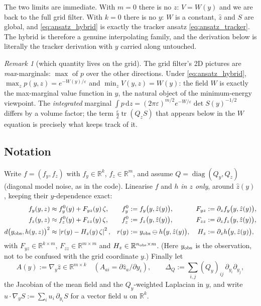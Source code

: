 \documentclass[11pt,a4paper]{article}
\newcommand{\R}{\mathbb{R}}
\newcommand{\dd}{\,\mathrm{d}}
\newcommand{\tr}{\operatorname{tr}}
\newcommand{\zh}{\hat{z}}
\newcommand{\eps}{\varepsilon}
\newcommand{\abs}[1]{\left\lvert #1 \right\rvert}
\newcommand{\gy}{\nabla_{\!y}}
\theoremstyle{plain}
\theoremstyle{definition}
\theoremstyle{remark}
\newtheorem{remark}{Remark}
\begin{document}
The two limits are immediate. With $m=0$ there is no $z$: $V=W(y)$ and we are back to the full grid filter. With $k=0$ there is no $y$: $W$ is a constant, $\zh$ and $S$ are global, and \eqref{eq:ansatz_hybrid} is exactly the tracker ansatz \eqref{eq:ansatz_tracker}. The hybrid is therefore a genuine interpolating family, and the derivation below is literally the tracker derivation with $y$ carried along untouched.

\begin{remark}[which quantity lives on the grid]
The grid filter's 2D pictures are \emph{max}-marginals: $\max$ of $p$ over the other directions. Under \eqref{eq:ansatz_hybrid}, $\max_z p(y,z) = e^{-W(y)/\eps}$ and $\min_z V(y,z)=W(y)$: the field $W$ is exactly the max-marginal value function in $y$, the natural object of the minimum-energy viewpoint. The \emph{integrated} marginal $\int p\dd z = (2\pi\eps)^{m/2} e^{-W/\eps}\det S(y)^{-1/2}$ differs by a volume factor; the term $\frac{\eps}{2}\tr(Q_zS)$ that appears below in the $W$ equation is precisely what keeps track of it.
\end{remark}

\subsection{Notation}

Write $f=(f_y,f_z)$ with $f_y\in\R^k$, $f_z\in\R^m$, and assume $Q=\operatorname{diag}(Q_y,Q_z)$ (diagonal model noise, as in the code). Linearise $f$ and $h$ \emph{in $z$ only}, around $\zh(y)$, keeping their $y$-dependence exact:
\begin{align*}
  f_y(y,z) &\approx f_y^0(y) + F_{yz}(y)\,\zeta, & f_y^0 &:= f_y\big(y,\zh(y)\big), & F_{yz} &:= \partial_z f_y\big(y,\zh(y)\big),\\
  f_z(y,z) &\approx f_z^0(y) + F_{zz}(y)\,\zeta, & f_z^0 &:= f_z\big(y,\zh(y)\big), & F_{zz} &:= \partial_z f_z\big(y,\zh(y)\big),\\
  d\big(y_{\rm obs},h(y,z)\big)^2 &\approx \abs{r(y) - H_z(y)\,\zeta}^2, & r(y) &:= y_{\rm obs}\ominus h\big(y,\zh(y)\big), & H_z &:= \partial_z h\big(y,\zh(y)\big),
\end{align*}
with $F_{yz}\in\R^{k\times m}$, $F_{zz}\in\R^{m\times m}$ and $H_z\in\R^{n_{\rm obs}\times m}$. (Here $y_{\rm obs}$ is the observation, not to be confused with the grid coordinate $y$.) Finally let
\[
  A(y) := \gy\zh \in\R^{m\times k}\quad (A_{ai}=\partial\zh_a/\partial y_i), \qquad
  \Delta_Q := \sum_{i,j} (Q_y)_{ij}\,\partial_{y_i}\partial_{y_j},
\]
the Jacobian of the mean field and the $Q_y$-weighted Laplacian in $y$, and write $u\cdot\gy S := \sum_i u_i\,\partial_{y_i}S$ for a vector field $u$ on $\R^k$.
\end{document}

